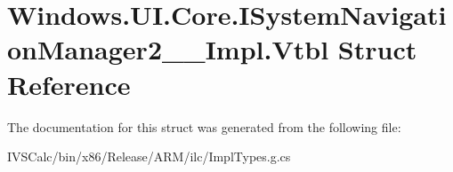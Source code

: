 \hypertarget{struct_windows_1_1_u_i_1_1_core_1_1_i_system_navigation_manager2_____impl_1_1_vtbl}{}\section{Windows.\+U\+I.\+Core.\+I\+System\+Navigation\+Manager2\+\_\+\+\_\+\+Impl.\+Vtbl Struct Reference}
\label{struct_windows_1_1_u_i_1_1_core_1_1_i_system_navigation_manager2_____impl_1_1_vtbl}


The documentation for this struct was generated from the following file\+:\begin{DoxyCompactItemize}
\item 
I\+V\+S\+Calc/bin/x86/\+Release/\+A\+R\+M/ilc/Impl\+Types.\+g.\+cs\end{DoxyCompactItemize}
